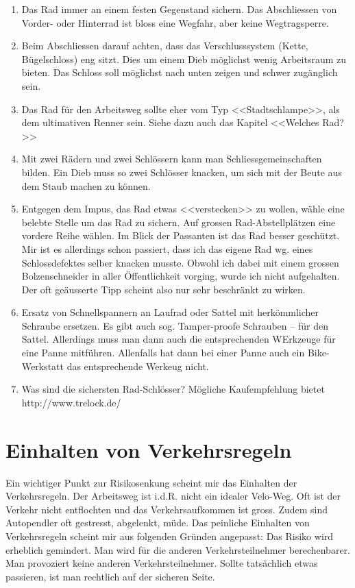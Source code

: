 \documentclass[a4paper,DIV13,BCOR1cm]{scrbook}
\begin{document}
\begin{enumerate}
  \item Das Rad immer an einem festen Gegenstand sichern. Das Abschliessen von Vorder- oder Hinterrad ist bloss eine 
    Wegfahr, aber keine Wegtragsperre.

  \item Beim Abschliessen darauf achten, dass das Verschlusssystem (Kette, Bügelschloss) eng sitzt.
    Dies um einem Dieb möglichst wenig Arbeitsraum zu bieten. Das Schloss soll möglichst nach unten zeigen und
    schwer zugänglich sein.

  \item Das Rad für den Arbeitsweg sollte eher vom Typ <<Stadtschlampe>>, als dem ultimativen Renner sein.
    Siehe dazu auch das Kapitel <<Welches Rad?>>

  \item Mit zwei Rädern und zwei Schlössern kann man Schliessgemeinschaften bilden.
    Ein Dieb muss so zwei Schlösser knacken, um sich mit der Beute aus dem Staub machen zu können.

  \item Entgegen dem Impus, das Rad etwas <<verstecken>> zu wollen, wähle eine belebte Stelle um das Rad zu sichern.
    Auf grossen Rad-Abstellplätzen eine vordere Reihe wählen.
    Im Blick der Passanten ist das Rad besser geschützt.
    Mir ist es allerdings schon passiert, dass ich das eigene Rad wg. eines Schlossdefektes selber knacken musste.
    Obwohl ich dabei mit einem grossen Bolzenschneider in aller Öffentlichkeit vorging, wurde ich nicht aufgehalten.
    Der oft geäusserte Tipp scheint also nur sehr beschränkt zu wirken.

  \item Ersatz von Schnellspannern an Laufrad oder Sattel mit herkömmlicher Schraube ersetzen.
    Es gibt auch sog. Tamper-proofe Schrauben -- für den Sattel. Allerdings muss man dann auch die entsprechenden WErkzeuge
    für eine Panne mitführen. Allenfalls hat dann bei einer Panne auch ein Bike-Werkstatt das entsprechende Werkeug nicht.

  \item Was sind die sichersten Rad-Schlösser? Mögliche Kaufempfehlung bietet http://www.trelock.de/

\end{enumerate}

\section{Einhalten von Verkehrsregeln}
Ein wichtiger Punkt zur Risikosenkung scheint mir das Einhalten der Verkehrsregeln. Der Arbeitsweg ist i.d.R. nicht ein idealer Velo-Weg. Oft ist der Verkehr nicht entflochten und das Verkehrsaufkommen ist gross. Zudem sind Autopendler oft gestresst, abgelenkt, müde.  Das peinliche Einhalten von Verkehrsregeln scheint mir aus folgenden Gründen angepasst:
Das Risiko wird erheblich gemindert. Man wird für die anderen Verkehrsteilnehmer berechenbarer.
Man provoziert keine anderen Verkehrsteilnehmer.
Sollte tatsächlich etwas passieren, ist man rechtlich auf der sicheren Seite.
\cite{Flieshardt2015}
\end{document}
